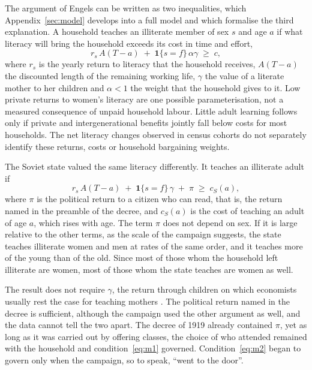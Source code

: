 \documentclass[12pt]{article}
\begin{document}
The argument of Engels can be written as two inequalities, which Appendix~\ref{sec:model} develops into a full model and which formalise the third explanation. A household teaches an illiterate member of sex $s$ and age $a$ if what literacy will bring the household exceeds its cost in time and effort,
\begin{equation}\label{eq:m1}
  r_s\,A(T-a) \;+\; \mathbf{1}\{s=f\}\,\alpha\gamma \;\ge\; c ,
\end{equation}
where $r_s$ is the yearly return to literacy that the household receives, $A(T-a)$ the discounted length of the remaining working life, $\gamma$ the value of a literate mother to her children and $\alpha<1$ the weight that the household gives to it. Low private returns to women's literacy are one possible parameterisation, not a measured consequence of unpaid household labour. Little adult learning follows only if private and intergenerational benefits jointly fall below costs for most households. The net literacy changes observed in census cohorts do not separately identify these returns, costs or household bargaining weights.

The Soviet state valued the same literacy differently. It teaches an illiterate adult if
\begin{equation}\label{eq:m2}
  r_s\,A(T-a) \;+\; \mathbf{1}\{s=f\}\,\gamma \;+\; \pi \;\ge\; c_S(a) ,
\end{equation}
where $\pi$ is the political return to a citizen who can read, that is, the return named in the preamble of the decree, and $c_S(a)$ is the cost of teaching an adult of age $a$, which rises with age. The term $\pi$ does not depend on sex. If it is large relative to the other terms, as the scale of the campaign suggests, the state teaches illiterate women and men at rates of the same order, and it teaches more of the young than of the old. Since most of those whom the household left illiterate are women, most of those whom the state teaches are women as well.

The result does not require $\gamma$, the return through children on which economists usually rest the case for teaching mothers \citep{galor2011}. The political return named in the decree is sufficient, although the campaign used the other argument as well, and the data cannot tell the two apart. The decree of 1919 already contained $\pi$, yet as long as it was carried out by offering classes, the choice of who attended remained with the household and condition~\eqref{eq:m1} governed. Condition~\eqref{eq:m2} began to govern only when the campaign, so to speak, ``went to the door''.
\end{document}
